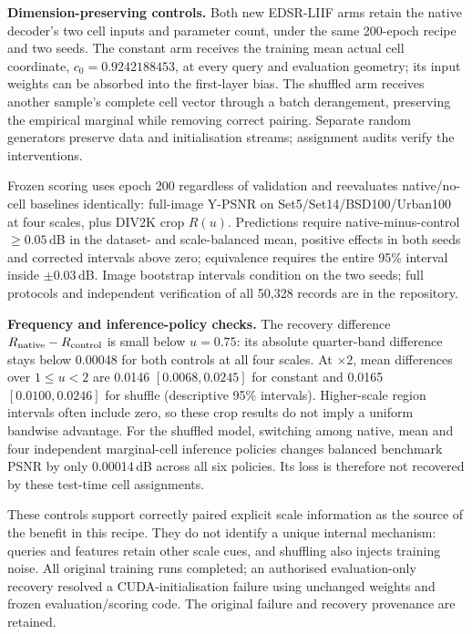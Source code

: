 \documentclass{article}
\begin{document}
\textbf{Dimension-preserving controls.} Both new EDSR-LIIF arms retain the native decoder's two cell inputs and parameter count, under the same 200-epoch recipe and two seeds. The constant arm receives the training mean actual cell coordinate, $c_0=0.9242188453$, at every query and evaluation geometry; its input weights can be absorbed into the first-layer bias. The shuffled arm receives another sample's complete cell vector through a batch derangement, preserving the empirical marginal while removing correct pairing. Separate random generators preserve data and initialisation streams; assignment audits verify the interventions.

Frozen scoring uses epoch 200 regardless of validation and reevaluates native/no-cell baselines identically: full-image Y-PSNR on Set5/Set14/BSD100/Urban100 at four scales, plus DIV2K crop $R(u)$. Predictions require native-minus-control $\ge0.05$\,dB in the dataset- and scale-balanced mean, positive effects in both seeds and corrected intervals above zero; equivalence requires the entire 95\% interval inside $\pm0.03$\,dB. Image bootstrap intervals condition on the two seeds; full protocols and independent verification of all 50,328 records are in the repository.

\textbf{Frequency and inference-policy checks.} The recovery difference $R_{\rm native}-R_{\rm control}$ is small below $u=0.75$: its absolute quarter-band difference stays below 0.00048 for both controls at all four scales. At $\times2$, mean differences over $1\le u<2$ are 0.0146 $[0.0068,0.0245]$ for constant and 0.0165 $[0.0100,0.0246]$ for shuffle (descriptive 95\% intervals). Higher-scale region intervals often include zero, so these crop results do not imply a uniform bandwise advantage. For the shuffled model, switching among native, mean and four independent marginal-cell inference policies changes balanced benchmark PSNR by only 0.00014\,dB across all six policies. Its loss is therefore not recovered by these test-time cell assignments.

These controls support correctly paired explicit scale information as the source of the benefit in this recipe. They do not identify a unique internal mechanism: queries and features retain other scale cues, and shuffling also injects training noise. All original training runs completed; an authorised evaluation-only recovery resolved a CUDA-initialisation failure using unchanged weights and frozen evaluation/scoring code. The original failure and recovery provenance are retained.
\end{document}
